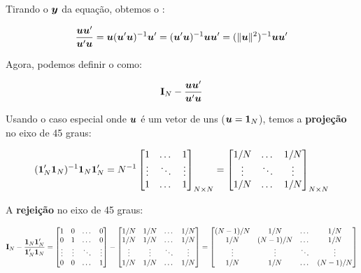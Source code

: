 \documentclass[11pt, oneside, a4paper, article]{article}
\numberwithin{equation}{section}
\begin{document}
\begin{description}
\noindent
Tirando o $\boldsymbol{y}$ da equação, obtemos o  :

\vspace{-1 em}
\begin{align*}
\frac{\boldsymbol{u} \boldsymbol{u}'}{\boldsymbol{u}'\boldsymbol{u}} 
=
\boldsymbol{u}(\boldsymbol{u}'\boldsymbol{u})^{-1} \boldsymbol{u}'
=
(\boldsymbol{u}'\boldsymbol{u})^{-1} \boldsymbol{u} \boldsymbol{u}'
=
(\|\boldsymbol{u} \|^2)^{-1} \boldsymbol{u} \boldsymbol{u}'
\end{align*}

Agora, podemos definir o  como:

\vspace{-1 em}
\begin{align*}
\mathbf{I}_{N} - \frac{\boldsymbol{u} \boldsymbol{u}'}{\boldsymbol{u}'\boldsymbol{u}} 
\end{align*}

Usando o caso especial onde $\boldsymbol{u}$ é um vetor de uns ($\boldsymbol{u} = \boldsymbol{1}_{N}$), temos a \textbf{projeção} no eixo de 45 graus:

\vspace{-1 em}
\begin{align*}
	( \boldsymbol{1}_{N}' \boldsymbol{1}_{N} )^{-1} \boldsymbol{1}_{N} \boldsymbol{1}_{N}'
=
N^{-1} 
\begin{bmatrix}
	1      & \dots  & 1	 \\
	\vdots & \ddots & \vdots \\
	1      & \dots  & 1	
\end{bmatrix}_{N \times N}
=
\begin{bmatrix}
	1/N    & \dots  & 1/N	 \\
	\vdots & \ddots & \vdots \\
	1/N    & \dots  & 1/N	
\end{bmatrix}_{N \times N}
\end{align*}

A \textbf{rejeição} no eixo de 45 graus:

\vspace{-1 em}
\begin{align*}
	\mathbf{I}_{N} - \frac{\boldsymbol{1}_{N} \boldsymbol{1}_{N}'}{\boldsymbol{1}_{N}' \boldsymbol{1}_{N}} 
=
\begin{bmatrix}
	1      & 0 &\dots  & 0	 \\
	0      & 1 &\dots  & 0	 \\
	\vdots & \vdots & \ddots & \vdots\\
	0      & 0 & \dots  & 1	
\end{bmatrix}
-
\begin{bmatrix}
	1/N    & 1/N    & \dots  & 1/N	 \\
	1/N    & 1/N    & \dots  & 1/N	 \\
	\vdots & \vdots & \ddots & \vdots \\
	1/N    & 1/N    & \dots  & 1/N	
\end{bmatrix}
=
\begin{bmatrix}
(N-1)/N & 1/N     & \dots  & 1/N    \\
1/N     & (N-1)/N & \dots  & 1/N    \\
\vdots  & \vdots  & \ddots & \vdots \\
1/N     & 1/N     & \dots  & (N-1)/N	
\end{bmatrix}
\end{align*}


\end{description}
\end{document}
